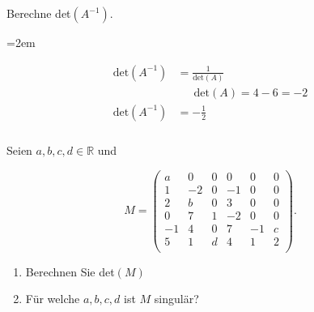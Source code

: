 Berechne det\((A^{-1})\).

\vspace{1\baselineskip}

\begin{solution}    

    \vspace{1\baselineskip}

    \leftskip=2em

    \begin{equation*}
        \begin{aligned}
            \text{det}(A^{-1}) &= \frac{1}{\text{det}(A)} \\[0.5em]
            & \quad \; \: \text{det}(A) = 4 -6 = -2 \\[0.5em]
            \text{det}(A^{-1}) &= - \frac{1}{2}
        \end{aligned}            
    \end{equation*}

\end{solution}

\newpage

\subsubsection{} %

Seien $a, b, c, d \in \mathbb{R}$ und

\begin{equation*}
    M = \begin{pmatrix}
    a & 0 & 0 & 0 & 0 & 0 \\
    1 & -2 & 0 & -1 & 0 & 0 \\
    2 & b & 0 & 3 & 0 & 0 \\
    0 & 7 & 1 & -2 & 0 & 0 \\
    -1 & 4 & 0 & 7 & -1 & c \\
    5 & 1 & d & 4 & 1 & 2 \\
    \end{pmatrix}.
\end{equation*}

\begin{enumerate}[label=\alph*)]
    \item Berechnen Sie det\((M)\)
    \item Für welche \( a, b, c, d \) ist \( M \) singulär?
\end{enumerate}

\vspace{1\baselineskip}

